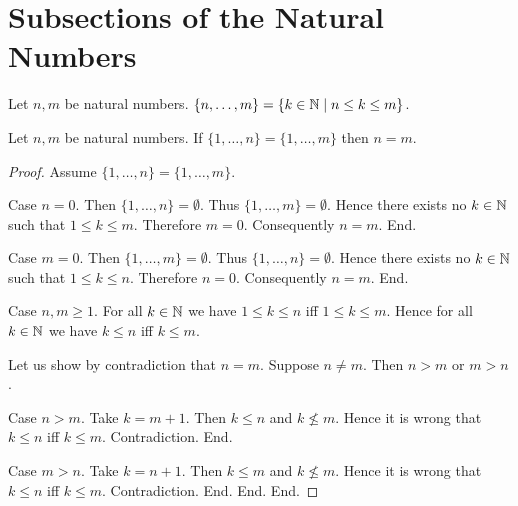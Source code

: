 \documentclass[10pt]{article}
\begin{document}
  \begin{imports}
    \begin{forthel}
    \end{forthel}
  \end{imports}


  \section{Subsections of the Natural Numbers}

  \begin{forthel}
    \begin{definition}
      Let $n, m$ be natural numbers.
      $\{ n, \dots, m \} = \{ k \in \mathbb{N} \mid n \leq k \leq m \}$.
    \end{definition}
  \end{forthel}

  \begin{forthel}
    \begin{proposition}
      Let $n, m$ be natural numbers.
      If $\{ 1, \dots, n \} = \{ 1, \dots, m \}$ then $n = m$.
    \end{proposition}
    \begin{proof}
      Assume $\{ 1, \dots, n \} = \{ 1, \dots, m \}$.

      Case $n = 0$.
        Then $\{ 1, \dots, n \} = \emptyset$.
        Thus $\{ 1, \dots, m \} = \emptyset$.
        Hence there exists no $k \in \mathbb{N}$ such that $1 \leq k \leq m$.
        Therefore $m = 0$.
        Consequently $n = m$.
      End.

      Case $m = 0$.
        Then $\{ 1, \dots, m \} = \emptyset$.
        Thus $\{ 1, \dots, n \} = \emptyset$.
        Hence there exists no $k \in \mathbb{N}$ such that $1 \leq k \leq n$.
        Therefore $n = 0$.
        Consequently $n = m$.
      End.

      Case $n, m \geq 1$.
        For all $k \in \mathbb{N}$ we have $1 \leq k \leq n$ iff $1 \leq k \leq m$.
        Hence for all $k \in \mathbb{N}$ we have $k \leq n$ iff $k \leq m$.

        Let us show by contradiction that $n = m$.
          Suppose $n \neq m$.
          Then $n > m$ or $m > n$.

          Case $n > m$.
            Take $k = m + 1$.
            Then $k \leq n$ and $k \nleq m$.
            Hence it is wrong that $k \leq n$ iff $k \leq m$.
            Contradiction.
          End.

          Case $m > n$.
            Take $k = n + 1$.
            Then $k \leq m$ and $k \nleq m$.
            Hence it is wrong that $k \leq n$ iff $k \leq m$.
            Contradiction.
          End.
        End.
      End.
    \end{proof}
  \end{forthel}
\end{document}
